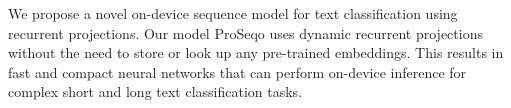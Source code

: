 We propose a novel on-device sequence model for text classification using recurrent projections. Our model ProSeqo uses dynamic recurrent projections without the need to store or look up any pre-trained embeddings. This results in fast and compact neural networks that can perform on-device inference for complex short and long text classification tasks.